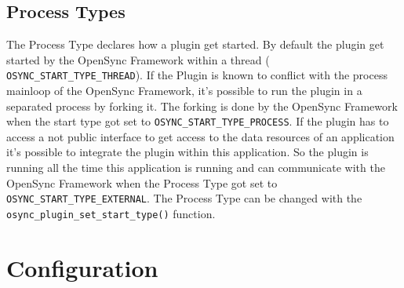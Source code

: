 \subsection{Process Types}
The Process Type declares how a plugin get started. By default the plugin get
started by the OpenSync Framework within a thread (
\verb|OSYNC_START_TYPE_THREAD|). If the Plugin is known to conflict with the 
process mainloop of the OpenSync Framework, it's possible to run the plugin in 
a separated process by forking it. The forking is done by the OpenSync
Framework when the start type got set to \verb|OSYNC_START_TYPE_PROCESS|. If the
plugin has to access a not public interface to get access to the data resources
of an application it's possible to integrate the plugin within this application.
So the plugin is running all the time this application is running and can
communicate with the OpenSync Framework when the Process Type got set to 
\verb|OSYNC_START_TYPE_EXTERNAL|. The Process Type can be changed with the 
\verb|osync_plugin_set_start_type()| function. 
\section{Configuration}
